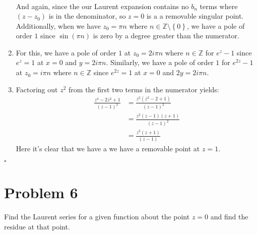 \documentclass[11pt]{article}
\newcommand{\Z}{\mathbb{Z}}
\newcommand{\set}[1]{\left\{ #1\right\}}
\newenvironment{proof}{\noindent{\bf Proof.}}{\hfill $\square$\medskip}
\begin{document}
\begin{proof}
\begin{enumerate}[label=\textbf{(\alph*)}]
\begin{equation}
\begin{split}
                  \end{split}
              \end{equation}
              And again, since the our Laurent expansion contains no $b_{n}$ terms where $(z-z_{0})$ is in the denominator, so $z=0$ is a a removable singular point. Additionally, when we have $z_{0}=\pi n$ where $n\in\Z\setminus\set{0}$, we have a pole of order $1$ since $\sin(\pi n)$ is zero by a degree greater than the numerator. 
        \item For this, we have a pole of order $1$ at $z_{0}=2i\pi n$ where $n\in\Z$ for $e^{z}-1$ since $e^{z}=1$ at $x=0$ and $y=2i\pi n$. Similarly, we have a pole of order $1$ for $e^{2z}-1$ at $z_{0}=i\pi n$ where $n\in\Z$ since $e^{2z}=1$ at $x=0$ and $2y=2i\pi n$. 
        \item Factoring out $z^{2}$ from the first two terms in the numerator yields:
        \begin{equation}
            \begin{split}
                \frac{z^{4}-2z^{2}+1}{(z-1)^{2}}&=\frac{z^{2}(z^{2}-2+1)}{(z-1)^{2}}\\
                &=\frac{z^{2}(z-1)(z+1)}{(z-1)^{2}}\\
                &=\frac{z^{2}(z+1)}{(z-1)}
            \end{split}
        \end{equation}
        Here it's clear that we have a we have a removable point at $z=1$.
    \end{enumerate}
\end{proof}


\newpage
\section{Problem 6}
Find the Laurent series for a given function about the point $z=0$ and find the residue at that point.
\end{document}
